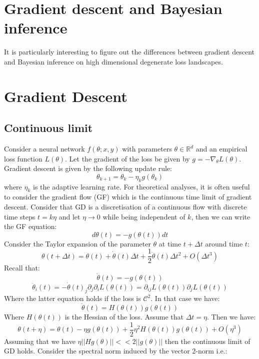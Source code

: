\documentclass[11pt]{article}
\begin{document}
\section{Gradient descent and Bayesian inference}
It is particularly interesting to figure out the differences between gradient descent and Bayesian inference on high dimensional degenerate loss landscapes. 


\section{Gradient Descent}
\subsection*{Continuous limit}
Consider a neural network $f(\theta; x,y)$ with parameters $\theta \in \mathbb{R}^d$ and an empirical loss function $L(\theta)$. Let the gradient of the loss be given by $g = -\nabla_{\theta} L(\theta)$. Gradient descent is given by the following update rule:
\begin{equation}
\theta_{k+1} = \theta_k - \eta_k g(\theta_k)
\end{equation}
where $\eta_k$ is the adaptive learning rate. For theoretical analyses, it is often useful to consider the gradient flow (GF) which is the continuous time limit of gradient descent. Consider that GD is a discretisation of a continuous flow with discrete time steps $t = k\eta$ and let $\eta \to 0$ while being independent of $k$, then we can write the GF equation:
\begin{equation}
d{\theta}(t) = - g(\theta(t)) dt
\end{equation}
Consider the Taylor expansion of the parameter $\theta$ at time $t+\Delta t$ around time $t$:
\begin{equation}
\theta(t+\Delta t) = \theta(t) + \dot{\theta}(t) \Delta t + \frac{1}{2} \ddot{\theta}(t) \Delta t^2 + O(\Delta t^3)
\end{equation}
Recall that:
\begin{equation}
\dot{\theta}(t) = - g(\theta(t))
\end{equation}
\begin{equation}
\ddot{\theta}_i(t) = - \dot{\theta}(t)_j \partial_j \partial_i L(\theta(t)) = \partial_{ij} L(\theta(t)) \partial_j L(\theta(t))
\end{equation}
Where the latter equation holds if the loss is $\mathcal{C}^2$. In that case we have:
\begin{equation}
      \ddot{\theta}(t) =  H(\theta(t)) g(\theta(t))
\end{equation}
Where $H(\theta(t))$ is the Hessian of the loss. Assume that $\Delta t = \eta$. Then we have:
\begin{equation}
\theta(t+\eta) = \theta(t) - \eta g(\theta(t)) + \frac{1}{2} \eta^2 H(\theta(t)) g(\theta(t)) + O(\eta^3)
\end{equation}
Assuming that we have $\eta||Hg(\theta)|| << 2||g(\theta)||$ then the continuous limit of GD holds. Consider the spectral norm induced by the vector 2-norm i.e.:
\end{document}
